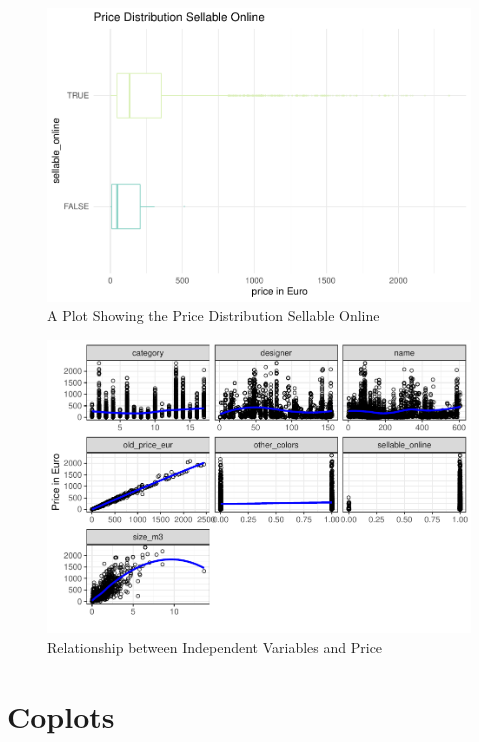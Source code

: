 \documentclass[a4paper, nobind]{templates/ociamthesis}
\begin{document}
\begin{figure}[!h]
\includegraphics[width=1\linewidth]{_main_files/figure-latex/price-dist-sellable-online-1} \caption{A Plot Showing the Price Distribution Sellable Online}\label{fig:price-dist-sellable-online}
\end{figure}

\begin{figure}[!h]
\includegraphics[width=1\linewidth]{_main_files/figure-latex/relationship-x-y-1} \caption{Relationship between Independent Variables and Price}\label{fig:relationship-x-y}
\end{figure}

\hypertarget{coplots}{%
\chapter{Coplots}\label{coplots}}
\end{document}
